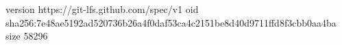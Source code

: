 version https://git-lfs.github.com/spec/v1
oid sha256:7e48ae5192ad520736b26a4f0daf53ca4c2151be8d40d9711ffd8f3cbb0aa4ba
size 58296
